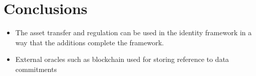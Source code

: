\section{Conclusions}
\label{apps:conclusions}

\begin{itemize}
    \item The asset transfer and regulation can be used in the identity framework in a way that the additions complete the framework.
    \item External oracles such as blockchain used for storing reference to data commitments
\end{itemize}




